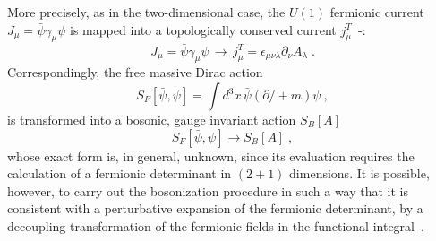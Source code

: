 \documentclass[a4paper,12pt]{article}
\begin{document}
More precisely, as in the two-dimensional case, the $U(1)$ fermionic
current~\mbox{$J_\mu =\bar\psi \gamma_\mu \psi$} is mapped into a topologically
conserved current $j_\mu^T$~\cite{result1}-\cite{result6}:
\begin{equation}
 \label{bos-curr}
J_\mu =\bar{\psi}\gamma_\mu \psi \,\longrightarrow \,j_\mu^T
=\epsilon_{\mu \nu \lambda}\partial _\nu A_\lambda \;.
\end{equation}
Correspondingly, the free massive Dirac action
\begin{equation}
S_F[\bar{\psi },\psi]=\int d^3 x\, \bar\psi \left( \partial \!\!\!/+m \right) \psi \ ,
\label{faction}
\end{equation}
is transformed into a bosonic, gauge invariant action $S_B[A]$
\begin{equation}
  \label{act-bos}
S_F[\bar{\psi },\psi]\longrightarrow S_B[A]\;,
\end{equation}
whose exact form is, in general, unknown, since its evaluation
requires the calculation of a fermionic determinant in $(2+1)$
dimensions. It is possible, however, to carry out the bosonization
procedure in such a way that it is consistent with a perturbative
expansion of the fermionic determinant, by a decoupling transformation
of the fermionic fields in the functional
integral~\cite{Fosco:1998gm}.
\end{document}
